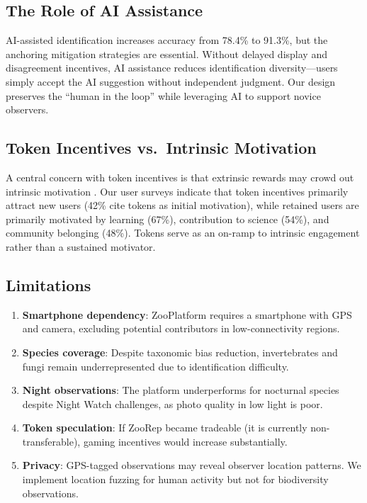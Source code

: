 \documentclass[11pt,a4paper]{article}
\begin{document}
\subsection{The Role of AI Assistance}

AI-assisted identification increases accuracy from 78.4\% to 91.3\%,
but the anchoring mitigation strategies are essential. Without delayed
display and disagreement incentives, AI assistance reduces identification
diversity---users simply accept the AI suggestion without independent
judgment. Our design preserves the ``human in the loop'' while leveraging
AI to support novice observers.

\subsection{Token Incentives vs.\ Intrinsic Motivation}

A central concern with token incentives is that extrinsic rewards may
crowd out intrinsic motivation \citep{deci1999meta}. Our user surveys
indicate that token incentives primarily attract new users (42\% cite
tokens as initial motivation), while retained users are primarily
motivated by learning (67\%), contribution to science (54\%), and
community belonging (48\%). Tokens serve as an on-ramp to intrinsic
engagement rather than a sustained motivator.

\subsection{Limitations}

\begin{enumerate}
  \item \textbf{Smartphone dependency}: ZooPlatform requires a
    smartphone with GPS and camera, excluding potential contributors
    in low-connectivity regions.
  \item \textbf{Species coverage}: Despite taxonomic bias reduction,
    invertebrates and fungi remain underrepresented due to
    identification difficulty.
  \item \textbf{Night observations}: The platform underperforms for
    nocturnal species despite Night Watch challenges, as photo quality
    in low light is poor.
  \item \textbf{Token speculation}: If ZooRep became tradeable (it is
    currently non-transferable), gaming incentives would increase
    substantially.
  \item \textbf{Privacy}: GPS-tagged observations may reveal observer
    location patterns. We implement location fuzzing for human activity
    but not for biodiversity observations.
\end{enumerate}
\end{document}
